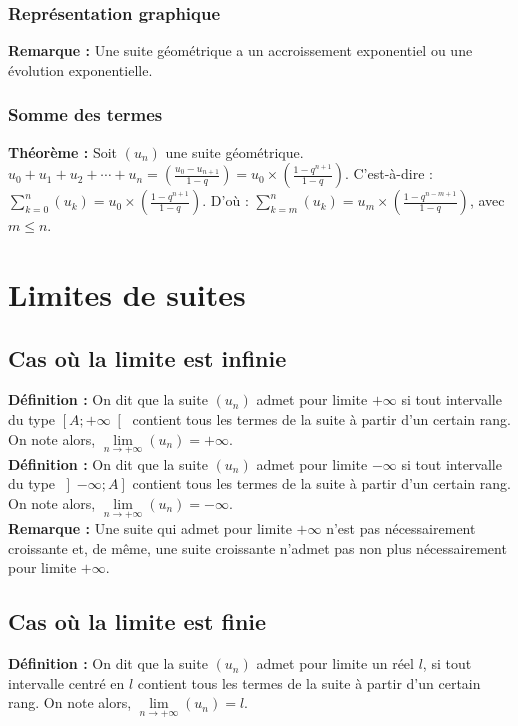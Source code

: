 \documentclass[a4paper,titlepage]{article}
\let\oldsection\section
\renewcommand\section{\clearpage\oldsection}
\begin{document}
        \subsubsection{Représentation graphique}
            \textbf{Remarque :} Une suite géométrique a un accroissement exponentiel ou une évolution exponentielle.
        \subsubsection{Somme des termes}
            \textbf{Théorème :} Soit $\left(u_{n}\right)$ une suite géométrique. $u_{0}+u_{1}+u_{2}+\cdots+u_{n}=\left(\frac{u_{0}-u_{n+1}}{1-q}\right)=u_{0}\times\left(\frac{1-q^{n+1}}{1-q}\right)$. C’est-à-dire : $\sum\limits_{k=0}^{n}\left(u_{k}\right)=u_{0}\times\left(\frac{1-q^{n+1}}{1-q}\right)$. D’où : $\sum\limits_{k=m}^{n}\left(u_{k}\right)=u_{m}\times\left(\frac{1-q^{n-m+1}}{1-q}\right)$, avec $m\leqslant n$.
\section{Limites de suites}
    \subsection{Cas où la limite est infinie}
        \textbf{Définition :} On dit que la suite $\left(u_{n}\right)$ admet pour limite $+\infty$ si tout intervalle du type $\left[A;+\infty\right[$ contient tous les termes de la suite à partir d’un certain rang. On note alors, $\lim\limits_{n\to+\infty}\left(u_{n}\right)=+\infty$.
        \\
        \textbf{Définition :} On dit que la suite $\left(u_{n}\right)$ admet pour limite $-\infty$ si tout intervalle du type $\left]-\infty;A\right]$ contient tous les termes de la suite à partir d’un certain rang. On note alors, $\lim\limits_{n\to+\infty}\left(u_{n}\right)=-\infty$.
        \\
        \textbf{Remarque :} Une suite qui admet pour limite $+\infty$ n’est pas nécessairement croissante et, de même, une suite croissante n’admet pas non plus nécessairement pour limite $+\infty$.
    \subsection{Cas où la limite est finie}
        \textbf{Définition :} On dit que la suite $\left(u_{n}\right)$ admet pour limite un réel $l$, si tout intervalle centré en $l$ contient tous les termes de la suite à partir d’un certain rang. On note alors, $\lim\limits_{n\to+\infty}\left(u_{n}\right)=l$.
\end{document}
